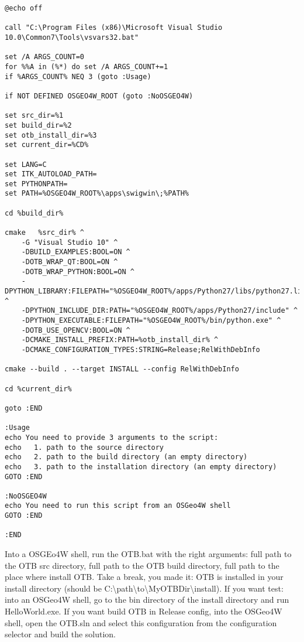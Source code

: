 \begin{verbatim}
@echo off

call "C:\Program Files (x86)\Microsoft Visual Studio 10.0\Common7\Tools\vsvars32.bat"

set /A ARGS_COUNT=0    
for %%A in (%*) do set /A ARGS_COUNT+=1  
if %ARGS_COUNT% NEQ 3 (goto :Usage)

if NOT DEFINED OSGEO4W_ROOT (goto :NoOSGEO4W)
	
set src_dir=%1
set build_dir=%2
set otb_install_dir=%3
set current_dir=%CD%

set LANG=C
set ITK_AUTOLOAD_PATH=
set PYTHONPATH=
set PATH=%OSGEO4W_ROOT%\apps\swigwin\;%PATH%

cd %build_dir%

cmake 	%src_dir% ^
	-G "Visual Studio 10" ^
	-DBUILD_EXAMPLES:BOOL=ON ^
	-DOTB_WRAP_QT:BOOL=ON ^
	-DOTB_WRAP_PYTHON:BOOL=ON ^
	-DPYTHON_LIBRARY:FILEPATH="%OSGEO4W_ROOT%/apps/Python27/libs/python27.lib" ^
	-DPYTHON_INCLUDE_DIR:PATH="%OSGEO4W_ROOT%/apps/Python27/include" ^
	-DPYTHON_EXECUTABLE:FILEPATH="%OSGEO4W_ROOT%/bin/python.exe" ^
	-DOTB_USE_OPENCV:BOOL=ON ^
	-DCMAKE_INSTALL_PREFIX:PATH=%otb_install_dir% ^
	-DCMAKE_CONFIGURATION_TYPES:STRING=Release;RelWithDebInfo

cmake --build . --target INSTALL --config RelWithDebInfo

cd %current_dir%

goto :END

:Usage
echo You need to provide 3 arguments to the script: 
echo   1. path to the source directory
echo   2. path to the build directory (an empty directory)
echo   3. path to the installation directory (an empty directory)
GOTO :END

:NoOSGEO4W
echo You need to run this script from an OSGeo4W shell
GOTO :END

:END
\end{verbatim}
Into a OSGEo4W shell, run the OTB.bat with the right arguments: full path to the OTB src directory, full path to the OTB build directory, full path to the place where install OTB. Take a break, you made it: OTB is installed in your install directory (should be C:\textbackslash path\textbackslash to\textbackslash MyOTBDir\textbackslash install). If you want test: into an OSGeo4W shell, go to the bin directory of the install directory and run HelloWorld.exe. If you want build OTB in Release config, into the OSGeo4W shell, open the OTB.sln and select this configuration from the configuration selector and build the solution.

